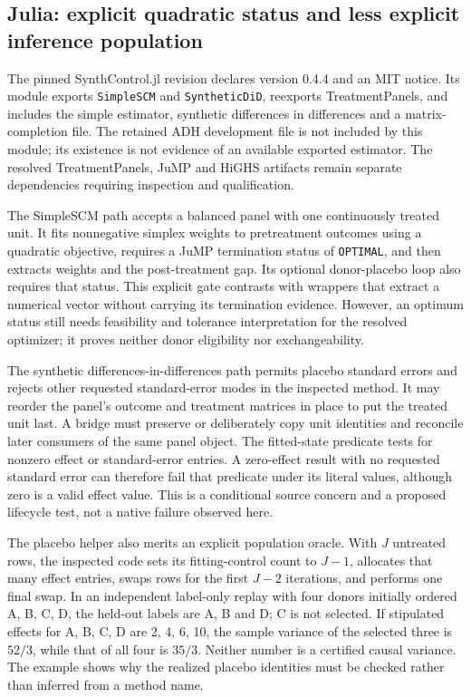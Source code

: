 \subsection{Julia: explicit quadratic status and less explicit inference population}
The pinned SynthControl.jl revision declares version 0.4.4 and an MIT notice.
Its module exports \texttt{SimpleSCM} and \texttt{SyntheticDiD}, reexports
TreatmentPanels, and includes the simple estimator, synthetic differences
in differences and a matrix-completion file. The retained ADH development
file is not included by this module; its existence is not evidence of an
available exported estimator. The resolved TreatmentPanels, JuMP and HiGHS
artifacts remain separate dependencies requiring inspection and qualification.
\citep{exec25_synthcross_julia}

The SimpleSCM path accepts a balanced panel with one continuously treated
unit. It fits nonnegative simplex weights to pretreatment outcomes using
a quadratic objective, requires a JuMP termination status of
\texttt{OPTIMAL}, and then extracts weights and the post-treatment gap.
Its optional donor-placebo loop also requires that status. This explicit
gate contrasts with wrappers that extract a numerical vector without
carrying its termination evidence. However, an optimum status still needs
feasibility and tolerance interpretation for the resolved optimizer;
it proves neither donor eligibility nor exchangeability.
\citep{exec25_synthcross_julia,exec25_synthcross_choice}

The synthetic differences-in-differences path permits placebo standard
errors and rejects other requested standard-error modes in the inspected
method. It may reorder the panel's outcome and treatment matrices in place
to put the treated unit last. A bridge must preserve or deliberately copy
unit identities and reconcile later consumers of the same panel object.
The fitted-state predicate tests for nonzero effect or standard-error
entries. A zero-effect result with no requested standard error can therefore
fail that predicate under its literal values, although zero is a valid
effect value. This is a conditional source concern and a proposed lifecycle
test, not a native failure observed here.~\citep{exec25_synthcross_julia}

The placebo helper also merits an explicit population oracle. With $J$
untreated rows, the inspected code sets its fitting-control count to $J-1$,
allocates that many effect entries, swaps rows for the first $J-2$ iterations,
and performs one final swap. In an independent label-only replay with four
donors initially ordered A, B, C, D, the held-out labels are A, B and D;
C is not selected. If stipulated effects for A, B, C, D are 2, 4, 6, 10,
the sample variance of the selected three is $52/3$, while that of all four
is $35/3$. Neither number is a certified causal variance. The example shows
why the realized placebo identities must be checked rather than inferred
from a method name.~\citep{exec25_synthcross_julia,exec25_synthcross_choice}

